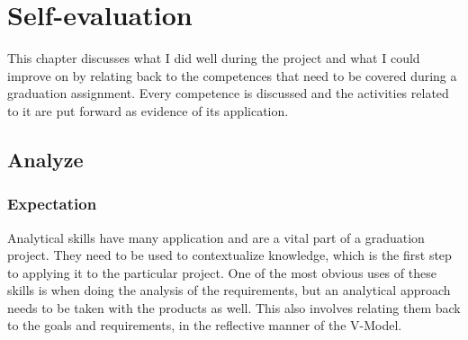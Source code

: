 \documentclass{report}
\begin{document}




\chapter{Self-evaluation}
This chapter discusses what I did well during the project and what I could improve on by relating back to the competences that need to be covered during a graduation assignment. Every competence is discussed and the activities related to it are put forward as evidence of its application.

\section{Analyze}\label{chap:analyze}%
\subsection{Expectation}
Analytical skills have many application and are a vital part of a graduation project. They need to be used to contextualize knowledge, which is the first step to applying it to the particular project. One of the most obvious uses of these skills is when doing the analysis of the requirements, but an analytical approach needs to be taken with the products as well. This also involves relating them back to the goals and requirements, in the reflective manner of the V-Model.
\end{document}

